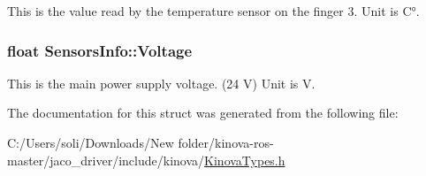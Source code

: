 This is the value read by the temperature sensor on the finger 3. Unit is C°. 

\subsubsection[{\texorpdfstring{Voltage}{Voltage}}]{\setlength{\rightskip}{0pt plus 5cm}float Sensors\+Info\+::\+Voltage}\hypertarget{struct_sensors_info_a9ced23ff499026d028b2179945091775}{}\label{struct_sensors_info_a9ced23ff499026d028b2179945091775}


This is the main power supply voltage. (24 V) Unit is V. 



The documentation for this struct was generated from the following file\+:\begin{DoxyCompactItemize}
\item 
C\+:/\+Users/soli/\+Downloads/\+New folder/kinova-\/ros-\/master/jaco\+\_\+driver/include/kinova/\hyperlink{_kinova_types_8h}{Kinova\+Types.\+h}\end{DoxyCompactItemize}
